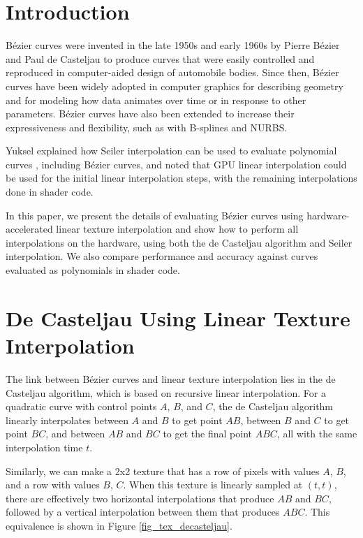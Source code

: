 \documentclass{jcgt}
\begin{document}
\section{Introduction}
\label{sec:introduction}

Bézier curves were invented in the late 1950s and early 1960s by Pierre Bézier and Paul de Casteljau to produce curves that were easily controlled and reproduced in computer-aided design
of automobile bodies. Since then, Bézier curves have been widely adopted in computer graphics for describing geometry and for modeling how data animates over time or in response to other
parameters. Bézier curves have also been extended to increase their expressiveness and flexibility, such as with B-splines and NURBS. 

Yuksel explained how Seiler interpolation can be used to evaluate polynomial curves \cite{10.1145/3641233.3664331}, including Bézier curves, and noted that GPU linear
interpolation could be used for the initial linear interpolation steps, with the remaining interpolations done in shader code.

In this paper, we present the details of evaluating Bézier curves using hardware-accelerated linear texture interpolation and show how to perform all interpolations on the hardware,
using both the de Casteljau algorithm and Seiler interpolation. We also compare performance and accuracy against curves evaluated as polynomials in shader code.

\section{De Casteljau Using Linear Texture Interpolation}



The link between Bézier curves and linear texture interpolation lies in the de Casteljau algorithm, which is based on recursive linear interpolation. For a quadratic curve with control points
$A$, $B$, and $C$, the de Casteljau algorithm linearly interpolates between $A$ and $B$ to get point $AB$, between $B$ and $C$ to get point $BC$, and between $AB$ and $BC$ to get the final
point $ABC$, all with the same interpolation time $t$.

Similarly, we can make a 2x2 texture that has a row of pixels with values $A$, $B$, and a row with values $B$, $C$. When this texture is linearly sampled at $(t, t)$, there
are effectively two horizontal interpolations that produce $AB$ and $BC$, followed by a vertical interpolation between them that produces $ABC$. This equivalence is shown in Figure \ref{fig_tex_decasteljau}.
\end{document}

